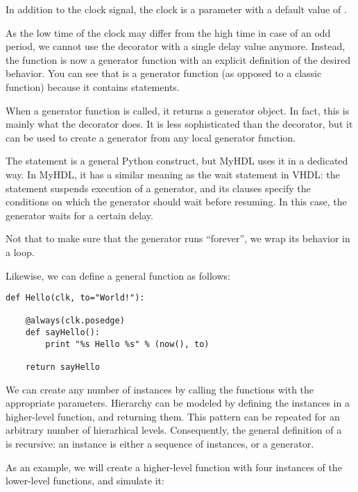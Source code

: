 In addition to the clock signal, the clock
 is a parameter with a default value of .

As the low time of the clock may differ from the high time in case of
an odd period, we cannot use the  decorator with a
single delay value anymore. Instead, the  function
is now a generator function with an explicit definition of the desired
behavior. You can see that  is a generator function (as
opposed to a classic function) because it contains 
statements.

When a generator function is called, it returns a generator object. In
fact, this is mainly what the  decorator does. It
is less sophisticated than the  decorator,
but it can be used to create a generator from any local generator
function.

The  statement is a general Python construct, but MyHDL
uses it in a dedicated way.  In MyHDL, it has a similar meaning as the
wait statement in VHDL: the statement suspends execution of a
generator, and its clauses specify the conditions on which the
generator should wait before resuming. In this case, the generator
waits for a certain delay.

Not that to make sure that the generator runs ``forever'', we wrap its
behavior in a  loop.

Likewise, we can define a general  function as follows:

\begin{verbatim}
def Hello(clk, to="World!"):

    @always(clk.posedge)
    def sayHello():
        print "%s Hello %s" % (now(), to)

    return sayHello
\end{verbatim}


We can create any number of instances by calling the functions with
the appropriate parameters. Hierarchy can be modeled by defining the
instances in a higher-level function, and returning them.
This pattern can be repeated for an arbitrary number of
hierarhical levels. Consequently, the general definition
of a \myhdl\  is recursive: an instance
is either a sequence of instances, or a generator.

As an example, we will create a higher-level function with
four instances of the lower-level functions, and simulate it:

